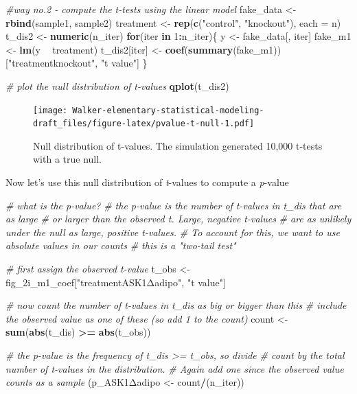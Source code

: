 \documentclass[]{book}
\newenvironment{Shaded}{\begin{snugshade}}{\end{snugshade}}
\newcommand{\CommentTok}[1]{\textcolor[rgb]{0.56,0.35,0.01}{\textit{#1}}}
\newcommand{\ControlFlowTok}[1]{\textcolor[rgb]{0.13,0.29,0.53}{\textbf{#1}}}
\newcommand{\DataTypeTok}[1]{\textcolor[rgb]{0.13,0.29,0.53}{#1}}
\newcommand{\DecValTok}[1]{\textcolor[rgb]{0.00,0.00,0.81}{#1}}
\newcommand{\KeywordTok}[1]{\textcolor[rgb]{0.13,0.29,0.53}{\textbf{#1}}}
\newcommand{\NormalTok}[1]{#1}
\newcommand{\OperatorTok}[1]{\textcolor[rgb]{0.81,0.36,0.00}{\textbf{#1}}}
\newcommand{\StringTok}[1]{\textcolor[rgb]{0.31,0.60,0.02}{#1}}
\begin{document}
\begin{Shaded}
\begin{Highlighting}[]
\CommentTok{#way no.2 - compute the t-tests using the linear model}
\NormalTok{fake_data <-}\StringTok{ }\KeywordTok{rbind}\NormalTok{(sample1, sample2)}
\NormalTok{treatment <-}\StringTok{ }\KeywordTok{rep}\NormalTok{(}\KeywordTok{c}\NormalTok{(}\StringTok{"control"}\NormalTok{, }\StringTok{"knockout"}\NormalTok{), }\DataTypeTok{each =}\NormalTok{ n)}
\NormalTok{t_dis2 <-}\StringTok{ }\KeywordTok{numeric}\NormalTok{(n_iter)}
\ControlFlowTok{for}\NormalTok{(iter }\ControlFlowTok{in} \DecValTok{1}\OperatorTok{:}\NormalTok{n_iter)\{}
\NormalTok{  y <-}\StringTok{ }\NormalTok{fake_data[, iter]}
\NormalTok{  fake_m1 <-}\StringTok{ }\KeywordTok{lm}\NormalTok{(y }\OperatorTok{~}\StringTok{ }\NormalTok{treatment)}
\NormalTok{  t_dis2[iter] <-}\StringTok{ }\KeywordTok{coef}\NormalTok{(}\KeywordTok{summary}\NormalTok{(fake_m1))[}\StringTok{"treatmentknockout"}\NormalTok{, }\StringTok{"t value"}\NormalTok{]}
\NormalTok{\}}


\CommentTok{# plot the null distribution of t-values}
\KeywordTok{qplot}\NormalTok{(t_dis2)}
\end{Highlighting}
\end{Shaded}

\begin{figure}
\centering
\texttt{[image: Walker-elementary-statistical-modeling-draft\_files/figure-latex/pvalue-t-null-1.pdf]}
\caption{\label{fig:pvalue-t-null}Null distribution of t-values. The simulation generated 10,000 t-tests with a true null.}
\end{figure}

Now let's use this null distribution of \emph{t}-values to compute a \emph{p}-value

\begin{Shaded}
\begin{Highlighting}[]
\CommentTok{# what is the p-value?}
\CommentTok{# the p-value is the number of t-values in t_dis that are as large}
\CommentTok{# or larger than the observed t. Large, negative t-values}
\CommentTok{# are as unlikely under the null as large, positive t-values.}
\CommentTok{# To account for this, we want to use absolute values in our counts}
\CommentTok{# this is a "two-tail test"}

\CommentTok{# first assign the observed t-value}
\NormalTok{t_obs <-}\StringTok{ }\NormalTok{fig_2i_m1_coef[}\StringTok{"treatmentASK1Δadipo"}\NormalTok{, }\StringTok{"t value"}\NormalTok{]}


\CommentTok{# now count the number of t-values in t_dis as big or bigger than this}
\CommentTok{# include the observed value as one of these (so add 1 to the count)}
\NormalTok{count <-}\StringTok{ }\KeywordTok{sum}\NormalTok{(}\KeywordTok{abs}\NormalTok{(t_dis) }\OperatorTok{>=}\StringTok{ }\KeywordTok{abs}\NormalTok{(t_obs))}

\CommentTok{# the p-value is the frequency of t_dis >= t_obs, so divide}
\CommentTok{# count by the total number of t-values in the distribution.}
\CommentTok{# Again add one since the observed value counts as a sample}
\NormalTok{(p_ASK1Δadipo <-}\StringTok{ }\NormalTok{count}\OperatorTok{/}\NormalTok{(n_iter))}
\end{Highlighting}
\end{Shaded}
\end{document}
